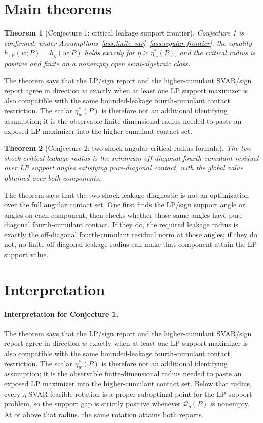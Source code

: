 \documentclass[11pt]{article}
\theoremstyle{definition}
\theoremstyle{plain}
\newtheorem{theorem}{Theorem}
\theoremstyle{remark}
\begin{document}
\section{Main theorems}
\begin{theorem}[Conjecture 1: critical leakage support frontier]\label{thm:critical-leakage-frontier}
Conjecture 1 is confirmed: under Assumptions~\ref{ass:finite-var}--\ref{ass:regular-frontier}, the equality \(h_{\mathrm{LP}}(w;P)=h_\eta(w;P)\) holds exactly for \(\eta\ge\eta_w^*(P)\), and the critical radius is positive and finite on a nonempty open semi-algebraic class.
\end{theorem}
The theorem says that the LP/sign report and the higher-cumulant SVAR/sign report agree in direction \(w\) exactly when at least one LP support maximizer is also compatible with the same bounded-leakage fourth-cumulant contact restriction.  The scalar \(\eta_w^*(P)\) is therefore not an additional identifying assumption; it is the observable finite-dimensional radius needed to paste an exposed LP maximizer into the higher-cumulant contact set.

\begin{theorem}[Conjecture 2: two-shock angular critical-radius formula]\label{thm:two-shock-formula}
The two-shock critical leakage radius is the minimum off-diagonal fourth-cumulant residual over LP support angles satisfying pure-diagonal contact, with the global value obtained over both components.
\end{theorem}
The theorem says that the two-shock leakage diagnostic is not an optimization over the full angular contact set.  One first finds the LP/sign support angle or angles on each component, then checks whether those same angles have pure-diagonal fourth-cumulant contact.  If they do, the required leakage radius is exactly the off-diagonal fourth-cumulant residual norm at those angles; if they do not, no finite off-diagonal leakage radius can make that component attain the LP support value.

\section{Interpretation}
\paragraph{Interpretation for Conjecture 1.}
The theorem says that the LP/sign report and the higher-cumulant SVAR/sign report agree in direction \(w\) exactly when at least one LP support maximizer is also compatible with the same bounded-leakage fourth-cumulant contact restriction.  The scalar \(\eta_w^*(P)\) is therefore not an additional identifying assumption; it is the observable finite-dimensional radius needed to paste an exposed LP maximizer into the higher-cumulant contact set.  Below that radius, every \(\eta\)-SVAR feasible rotation is a proper suboptimal point for the LP support problem, so the support gap is strictly positive whenever \(\mathcal Q_\eta(P)\) is nonempty.  At or above that radius, the same rotation attains both reports.
\end{document}
